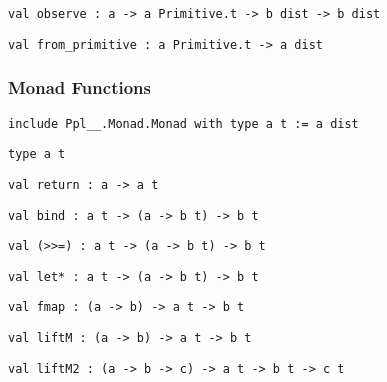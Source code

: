 \protect\hyperlink{val-observe}{}\texttt{val\ observe\ :\ \textquotesingle{}a\ -\textgreater{}\ \textquotesingle{}a\ Primitive.t\ -\textgreater{}\ \textquotesingle{}b\ dist\ -\textgreater{}\ \textquotesingle{}b\ dist}

\protect\hyperlink{val-fromux5fprimitive}{}\texttt{val\ from\_primitive\ :\ \textquotesingle{}a\ Primitive.t\ -\textgreater{}\ \textquotesingle{}a\ dist}

\hypertarget{distux5fmonad}{\subsubsection{\texorpdfstring{\protect\hyperlink{distux5fmonad}{}Monad
Functions}{Monad Functions}}\label{distux5fmonad}}

{\texttt{include\ Ppl\_\_.Monad.Monad\ with\ type\ \textquotesingle{}a\ t\ :=\ \textquotesingle{}a\ dist}}

\protect\hyperlink{type-t}{}\texttt{type\ \textquotesingle{}a\ t}

\protect\hyperlink{val-return}{}\texttt{val\ return\ :\ \textquotesingle{}a\ -\textgreater{}\ \textquotesingle{}a\ t}

\protect\hyperlink{val-bind}{}\texttt{val\ bind\ :\ \textquotesingle{}a\ t\ -\textgreater{}\ (\textquotesingle{}a\ -\textgreater{}\ \textquotesingle{}b\ t)\ -\textgreater{}\ \textquotesingle{}b\ t}

\protect\hyperlink{val-ux28ux5cux253Eux5cux253E=ux29}{}\texttt{val\ (\textgreater{}\textgreater{}=)\ :\ \textquotesingle{}a\ t\ -\textgreater{}\ (\textquotesingle{}a\ -\textgreater{}\ \textquotesingle{}b\ t)\ -\textgreater{}\ \textquotesingle{}b\ t}

\protect\hyperlink{val-letux2a}{}\texttt{val\ let*\ :\ \textquotesingle{}a\ t\ -\textgreater{}\ (\textquotesingle{}a\ -\textgreater{}\ \textquotesingle{}b\ t)\ -\textgreater{}\ \textquotesingle{}b\ t}

\protect\hyperlink{val-fmap}{}\texttt{val\ fmap\ :\ (\textquotesingle{}a\ -\textgreater{}\ \textquotesingle{}b)\ -\textgreater{}\ \textquotesingle{}a\ t\ -\textgreater{}\ \textquotesingle{}b\ t}

\protect\hyperlink{val-liftM}{}\texttt{val\ liftM\ :\ (\textquotesingle{}a\ -\textgreater{}\ \textquotesingle{}b)\ -\textgreater{}\ \textquotesingle{}a\ t\ -\textgreater{}\ \textquotesingle{}b\ t}

\protect\hyperlink{val-liftM2}{}\texttt{val\ liftM2\ :\ (\textquotesingle{}a\ -\textgreater{}\ \textquotesingle{}b\ -\textgreater{}\ \textquotesingle{}c)\ -\textgreater{}\ \textquotesingle{}a\ t\ -\textgreater{}\ \textquotesingle{}b\ t\ -\textgreater{}\ \textquotesingle{}c\ t}

